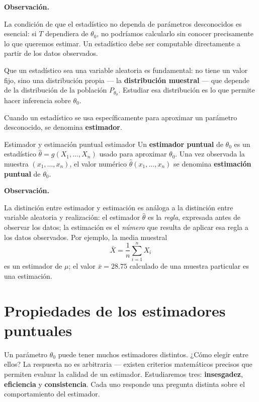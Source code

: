 \documentclass[12pt, a4paper]{book}
\newenvironment{observacion}{%
    \par\medskip\noindent\textbf{\color{azul}Observaci\'{o}n.}\enspace\itshape
}{\par\medskip}
\numberwithin{equation}{chapter}
\begin{document}
\begin{observacion}
	La condición de que el estadístico no dependa de
	parámetros desconocidos es esencial: si $T$ dependiera
	de $\theta_0$, no podríamos calcularlo sin conocer
	precisamente lo que queremos estimar. Un estadístico
	debe ser computable directamente a partir de los datos
	observados.
	
	Que un estadístico sea una variable aleatoria es
	fundamental: no tiene un valor fijo, sino una
	distribución propia --- la \textbf{distribución
		muestral} --- que depende de la distribución de la
	población $P_{\theta_0}$. Estudiar esa distribución
	es lo que permite hacer inferencia sobre $\theta_0$.
\end{observacion}

Cuando un estadístico se usa específicamente para aproximar
un parámetro desconocido, se denomina \textbf{estimador}.

\begin{definicion}{Estimador y estimaci\'{o}n puntual}
	{estimador}
	Un \textbf{estimador puntual} de $\theta_0$ es un
	estadístico $\hat{\theta} = g(X_1, \ldots, X_n)$ usado
	para aproximar $\theta_0$. Una vez observada la muestra
	$(x_1, \ldots, x_n)$, el valor numérico
	$\hat{\theta}(x_1, \ldots, x_n)$ se denomina
	\textbf{estimación puntual} de $\theta_0$.
\end{definicion}

\begin{observacion}
	La distinción entre estimador y estimación es análoga
	a la distinción entre variable aleatoria y realización:
	el estimador $\hat{\theta}$ es la \emph{regla},
	expresada antes de observar los datos; la estimación
	es el \emph{número} que resulta de aplicar esa regla
	a los datos observados. Por ejemplo, la media muestral
	\[
	\bar{X} = \frac{1}{n}\sum_{i=1}^n X_i
	\]
	es un estimador de $\mu$; el valor $\bar{x} = 28.75$
	calculado de una muestra particular es una estimación.
\end{observacion}

\section{Propiedades de los estimadores puntuales}
\label{sec:propiedades_estimadores}

Un parámetro $\theta_0$ puede tener muchos estimadores
distintos. ¿Cómo elegir entre ellos? La respuesta no es
arbitraria --- existen criterios matemáticos precisos que
permiten evaluar la calidad de un estimador. Estudiaremos
tres: \textbf{insesgadez}, \textbf{eficiencia} y
\textbf{consistencia}. Cada uno responde una pregunta
distinta sobre el comportamiento del estimador.
\end{document}
